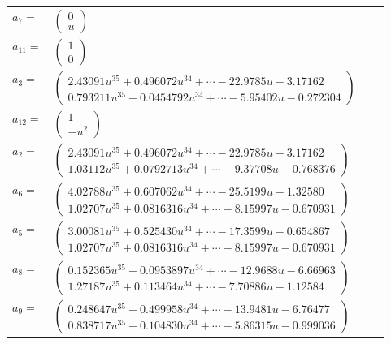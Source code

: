 \documentclass[1p]{elsarticle_modified}
\theoremstyle{definition}
\begin{document}
\begin{tabular}{m{7pt} m{180pt} m{7pt} m{180pt} }
\flushright $a_{7}=$&$\begin{pmatrix}0\\u\end{pmatrix}$ \\
\flushright $a_{11}=$&$\begin{pmatrix}1\\0\end{pmatrix}$ \\
\flushright $a_{3}=$&$\begin{pmatrix}2.43091 u^{35}+0.496072 u^{34}+\cdots-22.9785 u-3.17162\\0.793211 u^{35}+0.0454792 u^{34}+\cdots-5.95402 u-0.272304\end{pmatrix}$ \\
\flushright $a_{12}=$&$\begin{pmatrix}1\\- u^2\end{pmatrix}$ \\
\flushright $a_{2}=$&$\begin{pmatrix}2.43091 u^{35}+0.496072 u^{34}+\cdots-22.9785 u-3.17162\\1.03112 u^{35}+0.0792713 u^{34}+\cdots-9.37708 u-0.768376\end{pmatrix}$ \\
\flushright $a_{6}=$&$\begin{pmatrix}4.02788 u^{35}+0.607062 u^{34}+\cdots-25.5199 u-1.32580\\1.02707 u^{35}+0.0816316 u^{34}+\cdots-8.15997 u-0.670931\end{pmatrix}$ \\
\flushright $a_{5}=$&$\begin{pmatrix}3.00081 u^{35}+0.525430 u^{34}+\cdots-17.3599 u-0.654867\\1.02707 u^{35}+0.0816316 u^{34}+\cdots-8.15997 u-0.670931\end{pmatrix}$ \\
\flushright $a_{8}=$&$\begin{pmatrix}0.152365 u^{35}+0.0953897 u^{34}+\cdots-12.9688 u-6.66963\\1.27187 u^{35}+0.113464 u^{34}+\cdots-7.70886 u-1.12584\end{pmatrix}$ \\
\flushright $a_{9}=$&$\begin{pmatrix}0.248647 u^{35}+0.499958 u^{34}+\cdots-13.9481 u-6.76477\\0.838717 u^{35}+0.104830 u^{34}+\cdots-5.86315 u-0.999036\end{pmatrix}$ \\

\end{tabular}
\end{document}

